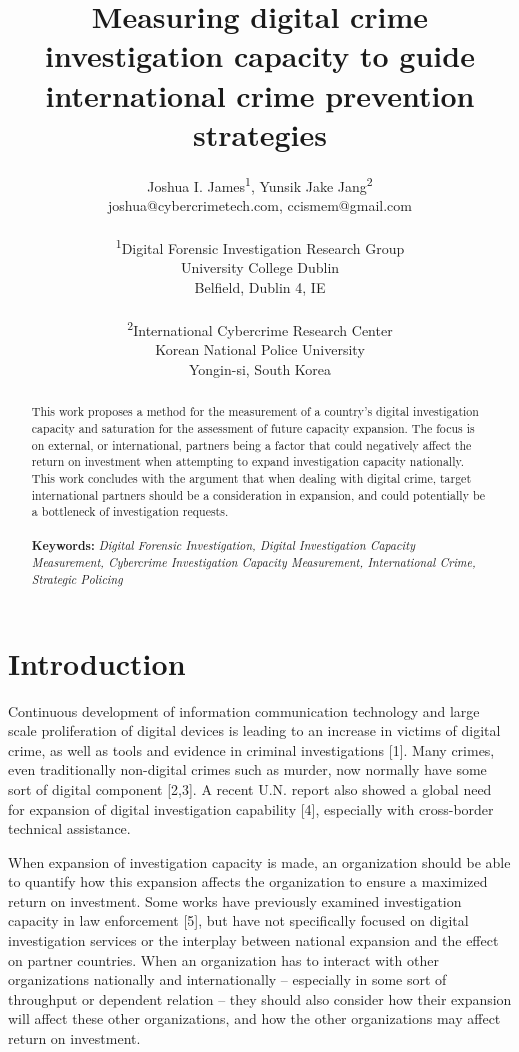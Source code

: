 \documentclass[10pt,a4paper]{article}
\author{Joshua I. James\textsuperscript{1}, Yunsik Jake Jang\textsuperscript{2}\\
joshua@cybercrimetech.com, ccismem@gmail.com\\
\\
\textsuperscript{1}Digital Forensic Investigation Research Group\\
University College Dublin\\
Belfield, Dublin 4, IE\\
\\
\textsuperscript{2}International Cybercrime Research Center\\
Korean National Police University\\
Yongin-si, South Korea}
\title{Measuring digital crime investigation capacity to guide international crime prevention strategies}
\date{}
\begin{document}
\maketitle

\begin{abstract}
\noindent This work proposes a method for the measurement of a country's digital investigation capacity and saturation for the assessment of future capacity expansion. The focus is on external, or international, partners being a factor that could negatively affect the return on investment when attempting to expand investigation capacity nationally. This work concludes with the argument that when dealing with digital crime, target international partners should be a consideration in expansion, and could potentially be a bottleneck of investigation requests.
\\
\\
\textbf{Keywords:} \textit{Digital Forensic Investigation, Digital Investigation Capacity Measurement, Cybercrime Investigation Capacity Measurement, International Crime, Strategic Policing}
\end{abstract}

\section{Introduction}
Continuous development of information communication technology and large scale proliferation of digital devices is leading to an increase in victims of digital crime, as well as tools and evidence in criminal investigations [1]. Many crimes, even traditionally non-digital crimes such as murder, now normally have some sort of digital component [2,3]. A recent U.N. report also showed a global need for expansion of digital investigation capability [4], especially with cross-border technical assistance.

When expansion of investigation capacity is made, an organization should be able to quantify how this expansion affects the organization to ensure a maximized return on investment. Some works have previously examined investigation capacity in law enforcement [5], but have not specifically focused on digital investigation services or the interplay between national expansion and the effect on partner countries. When an organization has to interact with other organizations nationally and internationally -- especially in some sort of throughput or dependent relation -- they should also consider how their expansion will affect these other organizations, and how the other organizations may affect return on investment.
\end{document}
